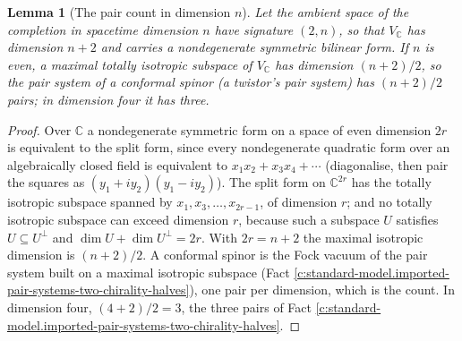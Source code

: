 \documentclass[11pt]{article}
\newtheorem{lemma}[theorem]{Lemma}
\theoremstyle{definition}
\theoremstyle{plain}
\newcommand{\changedmark}[2]{\marginpar{\raggedright\scriptsize\color{#1}#2}}
\providecommand{\C}{}\renewcommand{\C}{\mathbb{C}}
\begin{document}
\begin{lemma}[The pair count in dimension $n$]\label{c:standard-model.pair-count-dimension}
\changedmark{gray}{reworded}
Let the ambient space of the completion in spacetime dimension $n$ have signature $(2, n)$, so that $V_{\C}$ has dimension $n + 2$ and carries a nondegenerate symmetric bilinear form. If $n$ is even, a maximal totally isotropic subspace of $V_{\C}$ has dimension $(n+2)/2$, so the pair system of a conformal spinor (a twistor's pair system) has $(n+2)/2$ pairs; in dimension four it has three.
\end{lemma}
\begin{proof}
Over $\C$ a nondegenerate symmetric form on a space of even dimension $2r$ is equivalent to the split form, since every nondegenerate quadratic form over an algebraically closed field is equivalent to $x_{1}x_{2} + x_{3}x_{4} + \cdots$ (diagonalise, then pair the squares as $(y_{1} + iy_{2})(y_{1} - iy_{2})$). The split form on $\C^{2r}$ has the totally isotropic subspace spanned by $x_{1}, x_{3}, \ldots, x_{2r-1}$, of dimension $r$; and no totally isotropic subspace can exceed dimension $r$, because such a subspace $U$ satisfies $U \subseteq U^{\perp}$ and $\dim U + \dim U^{\perp} = 2r$. With $2r = n + 2$ the maximal isotropic dimension is $(n+2)/2$. A conformal spinor is the Fock vacuum of the pair system built on a maximal isotropic subspace (Fact \ref{c:standard-model.imported-pair-systems-two-chirality-halves}), one pair per dimension, which is the count. In dimension four, $(4+2)/2 = 3$, the three pairs of Fact \ref{c:standard-model.imported-pair-systems-two-chirality-halves}.

\end{proof}
\end{document}
